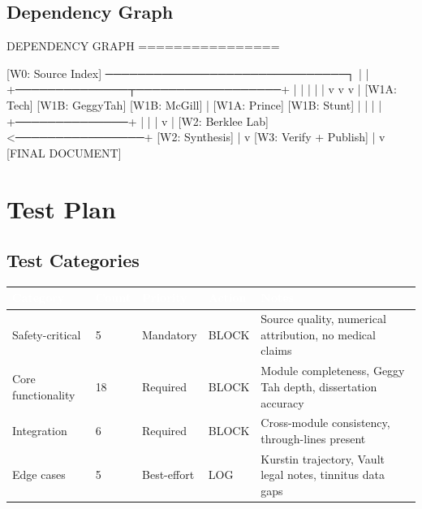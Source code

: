 \documentclass[11pt,letterpaper]{article}
\newcommand{\tableheader}[1]{\textbf{\sffamily\textcolor{white}{#1}}}
\begin{document}
\subsection{Dependency Graph}

\begin{asciibox}
DEPENDENCY GRAPH
================

[W0: Source Index] ──────────────────────────────┐
        |                                         |
        +──────────────┬──────────────────+       |
        |              |                  |       |
        v              v                  v       |
  [W1A: Tech]    [W1B: GeggyTah]   [W1B: McGill] |
  [W1A: Prince]  [W1B: Stunt]                     |
        |              |                          |
        +──────────────+                          |
                       |                          |
                       v                          |
               [W2: Berklee Lab] <────────────────+
               [W2: Synthesis]
                       |
                       v
               [W3: Verify + Publish]
                       |
                       v
               [FINAL DOCUMENT]
\end{asciibox}

\section{Test Plan}

\subsection{Test Categories}

\begin{center}
\begin{tabularx}{\textwidth}{L{3cm}C{1.5cm}C{2cm}C{2cm}X}
\toprule
{}
\tableheader{Category} & \tableheader{Count} & \tableheader{Priority} & \tableheader{Action} & \tableheader{Notes} \\
\midrule
Safety-critical & 5 & Mandatory & BLOCK & Source quality, numerical attribution, no medical claims \\
Core functionality & 18 & Required & BLOCK & Module completeness, Geggy Tah depth, dissertation accuracy \\
Integration & 6 & Required & BLOCK & Cross-module consistency, through-lines present \\
Edge cases & 5 & Best-effort & LOG & Kurstin trajectory, Vault legal notes, tinnitus data gaps \\
\bottomrule
\end{tabularx}
\end{center}
\end{document}
